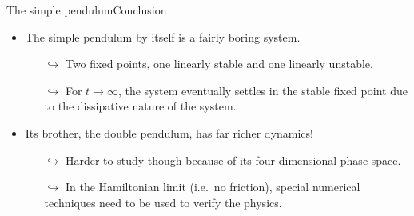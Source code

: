 \documentclass[usenames,dvipsnames,svgnames,10pt,aspectratio=169]{beamer}
\begin{document}
\begin{frame}[t, c]{The simple pendulum}{Conclusion}
	\begin{minipage}{.68\textwidth}
		\begin{itemize}
			\item The simple pendulum by itself is a fairly boring system.
			\begin{itemize}
				\item[\( \hookrightarrow \)] Two fixed points, one linearly stable and one linearly unstable.
				\item[\( \hookrightarrow \)] For \( t \to \infty \), the system eventually settles in the stable fixed point due to the dissipative nature of the system.
			\end{itemize}

			\bigskip

			\item Its brother, the double pendulum, has far richer dynamics!
			\begin{itemize}
				\item[\( \hookrightarrow \)] Harder to study though because of its four-dimensional phase space.
				\item[\( \hookrightarrow \)] In the Hamiltonian limit (i.e.\ no friction), special numerical techniques need to be used to verify the physics.
			\end{itemize}
		\end{itemize}
	\end{minipage}%
	\hfill
	\begin{minipage}{.28\textwidth}
		\centering
	\end{minipage}

	\vspace{1cm}
\end{frame}
\end{document}
